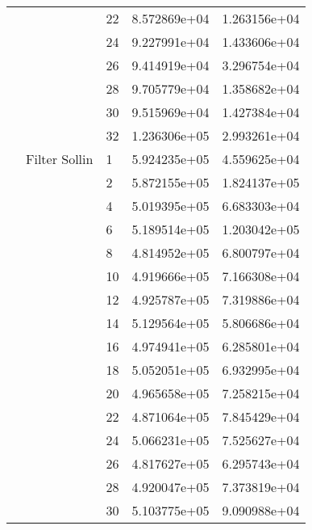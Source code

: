 \begin{tabular}{lllrr}
                      &                     & 22 &  8.572869e+04 &  1.263156e+04 \\
                      &                     & 24 &  9.227991e+04 &  1.433606e+04 \\
                      &                     & 26 &  9.414919e+04 &  3.296754e+04 \\
                      &                     & 28 &  9.705779e+04 &  1.358682e+04 \\
                      &                     & 30 &  9.515969e+04 &  1.427384e+04 \\
                      &                     & 32 &  1.236306e+05 &  2.993261e+04 \\
                      & Filter Sollin & 1  &  5.924235e+05 &  4.559625e+04 \\
                      &                     & 2  &  5.872155e+05 &  1.824137e+05 \\
                      &                     & 4  &  5.019395e+05 &  6.683303e+04 \\
                      &                     & 6  &  5.189514e+05 &  1.203042e+05 \\
                      &                     & 8  &  4.814952e+05 &  6.800797e+04 \\
                      &                     & 10 &  4.919666e+05 &  7.166308e+04 \\
                      &                     & 12 &  4.925787e+05 &  7.319886e+04 \\
                      &                     & 14 &  5.129564e+05 &  5.806686e+04 \\
                      &                     & 16 &  4.974941e+05 &  6.285801e+04 \\
                      &                     & 18 &  5.052051e+05 &  6.932995e+04 \\
                      &                     & 20 &  4.965658e+05 &  7.258215e+04 \\
                      &                     & 22 &  4.871064e+05 &  7.845429e+04 \\
                      &                     & 24 &  5.066231e+05 &  7.525627e+04 \\
                      &                     & 26 &  4.817627e+05 &  6.295743e+04 \\
                      &                     & 28 &  4.920047e+05 &  7.373819e+04 \\
                      &                     & 30 &  5.103775e+05 &  9.090988e+04 \\

\end{tabular}

